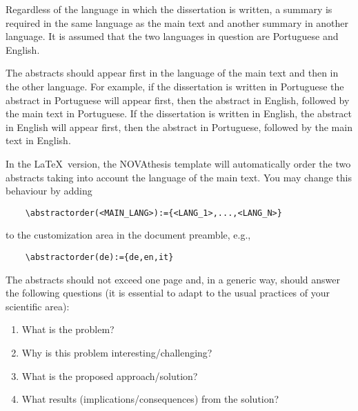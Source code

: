 

Regardless of the language in which the dissertation is written, a summary is required in the same language as the main text and another summary in another language. It is assumed that the two languages in question are Portuguese and English.

The abstracts should appear first in the language of the main text and then in the other language. For example, if the dissertation is written in Portuguese the abstract in Portuguese will appear first, then the abstract in English, followed by the main text in Portuguese. If the dissertation is written in English, the abstract in English will appear first, then the abstract in Portuguese, followed by the main text in English. 

In the \LaTeX\ version, the NOVAthesis template will automatically order the two abstracts taking into account the language of the main text. You may change this behaviour by adding
\begin{verbatim}
    \abstractorder(<MAIN_LANG>):={<LANG_1>,...,<LANG_N>}
\end{verbatim}
\noindent to the customization area in the document preamble, e.g.,
\begin{verbatim}
    \abstractorder(de):={de,en,it}
\end{verbatim}

The abstracts should not exceed one page and, in a generic way, should answer the following questions (it is essential to adapt to the usual practices of your scientific area):

\begin{enumerate}
  \item What is the problem?
  \item Why is this problem interesting/challenging?
  \item What is the proposed approach/solution?
  \item What results (implications/consequences) from the solution?
\end{enumerate}

